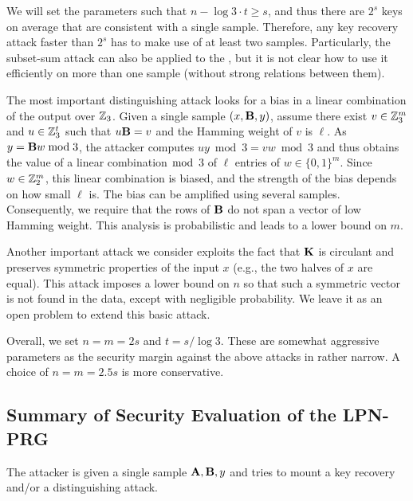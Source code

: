 We will set the parameters such that $n - \log 3 \cdot t \geq s$,
and thus there are $2^s$ keys on average that are consistent with a single sample.
Therefore, any key recovery attack faster than $2^s$ has to make use of at least two samples.
Particularly, the subset-sum attack can also be applied to the \ttwPRF,
but it is not clear how to use it efficiently on more than one sample
(without strong relations between them).

The most important distinguishing attack looks for a bias in a linear combination
of the output over $\mathbb{Z}_3$.
Given a single sample $(x,\mat{B},y)$, assume there exist
$v \in \mathbb{Z}_3^m$ and $u \in \mathbb{Z}_3^t$ such that $u \mat{B} = v$ and the Hamming weight of $v$ is $\ell$.
As $y = \mat{B}w \bmod 3$, the attacker computes $uy \bmod 3 = vw \bmod 3$
and thus obtains the value of a linear combination $\bmod$ 3 of $\ell$ entries of $w \in \{0,1\}^m$.
Since $w \in \mathbb{Z}_2^m$, this linear combination is biased, 
and the strength of the bias depends on how small $\ell$ is.
The bias can be amplified using several samples.
Consequently, we require that the rows of $\mat{B}$ do not span a vector of low Hamming weight.
This analysis is probabilistic and leads to a lower bound on $m$.

Another important attack we consider exploits the fact that $\mat{K}$
is circulant and preserves symmetric properties of the input $x$ (e.g., the two halves of $x$ are equal). 
This attack imposes a lower bound on $n$ so that such a symmetric vector is not found
in the data, except with negligible probability. 
We leave it as an open problem to extend this basic attack.


Overall, we set $n=m=2s$ and $t = s/\log 3$.
These are somewhat aggressive parameters as the security margin against the above attacks
in rather narrow. A choice of $n=m=2.5s$ is more conservative.

\subsection{Summary of Security Evaluation of the LPN-PRG}

The attacker is given a single sample $\mat{A},\mat{B},y$
and tries to mount a key recovery and/or a distinguishing attack.

